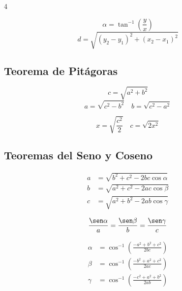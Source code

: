 \documentclass[9pt, landscape, letterpaper]{extarticle}
\begin{document}
\begin{multicols}{4}
  \begin{formulabox}
    $$\alpha = \tan^{-1}\!\left(\frac{y}{x}\right)$$
    $$d = \sqrt{(y_2 - y_1)^2 + (x_2 - x_1)^2}$$
  \end{formulabox}

  \subsection{Teorema de Pitágoras}

  \begin{formulabox}
    $$c = \sqrt{a^2 + b^2}$$
    $$a = \sqrt{c^2 - b^2} \quad b = \sqrt{c^2 - a^2}$$
  \end{formulabox}

  \begin{despejesbox}
    $$x = \sqrt{\frac{c^2}{2}} \quad c = \sqrt{2x^2}$$
  \end{despejesbox}

  \subsection{Teoremas del Seno y Coseno}

  \begin{formulabox}
    \begin{align*}
      a & = \sqrt{b^2 + c^2 - 2bc\cos\alpha} \\
      b & = \sqrt{a^2 + c^2 - 2ac\cos\beta}  \\
      c & = \sqrt{a^2 + b^2 - 2ab\cos\gamma}
    \end{align*}
    \vspace{-8pt}
  \end{formulabox}

  \begin{formulabox}
    $$\frac{\sen\alpha}{a} = \frac{\sen\beta}{b} = \frac{\sen\gamma}{c}$$
  \end{formulabox}

  \begin{despejesbox}[Ángulos]
    \begin{align*}
      \alpha & = \cos^{-1}\!\left(\frac{-a^2 + b^2 + c^2}{2bc}\right) \\
      \beta  & = \cos^{-1}\!\left(\frac{-b^2 + a^2 + c^2}{2ac}\right) \\
      \gamma & = \cos^{-1}\!\left(\frac{-c^2 + a^2 + b^2}{2ab}\right)
    \end{align*}
    \vspace{-8pt}
  \end{despejesbox}


\end{multicols}
\end{document}
